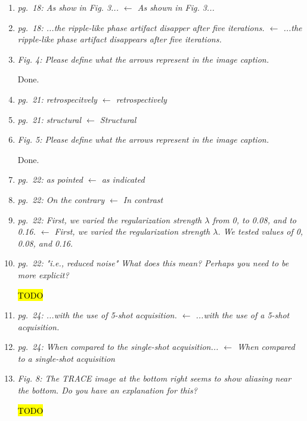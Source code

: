 \documentclass[a4paper,11pt,twoside]{report}
\begin{document}
\begin{enumerate}[resume]
    \item \textit{pg.~18: As show in Fig. 3... $\leftarrow$ As shown in Fig. 3...}
    \item \textit{pg.~18: ...the ripple-like phase artifact disapper after five iterations. $\leftarrow$ ...the ripple-like phase artifact disappears after five iterations.}
    \item \textit{Fig. 4: Please define what the arrows represent in the image caption.}

    \hspace{1em} {\color{blue} Done.}

    \item \textit{pg.~21: retrospecitvely $\leftarrow$ retrospectively}
    \item \textit{pg.~21: structural $\leftarrow$ Structural}
    \item \textit{Fig. 5: Please define what the arrows represent in the image caption.}

    \hspace{1em} {\color{blue} Done.}

    \item \textit{pg.~22: as pointed $\leftarrow$ as indicated}
    \item \textit{pg.~22: On the contrary $\leftarrow$ In contrast}
    \item \textit{pg.~22: First, we varied the regularization strength $\lambda$ from 0, to 0.08, and to 0.16. $\leftarrow$ First, we varied the regularization strength $\lambda$. We tested values of 0, 0.08, and 0.16.}
    \item \textit{pg.~22: "i.e., reduced noise" What does this mean? Perhaps you need to be more explicit?}

    \hspace{1em} {\color{blue} \hl{TODO}}

    \item \textit{pg.~24: ...with the use of 5-shot acquisition. $\leftarrow$ ...with the use of a 5-shot acquisition.}
    \item \textit{pg.~24: When compared to the single-shot acquisition... $\leftarrow$ When compared to a single-shot acquisition}
    \item \textit{Fig. 8: The TRACE image at the bottom right seems to show aliasing near the bottom. Do you have an explanation for this?}

    \hspace{1em} {\color{blue} \hl{TODO}}


\end{enumerate}
\end{document}
